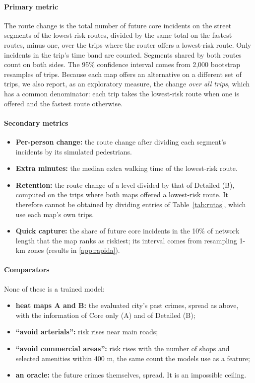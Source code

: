 \documentclass[preprint,12pt,authoryear]{elsarticle}
\begin{document}
\paragraph{Primary metric} The route change is the total number of future core incidents on the street segments of the lowest-risk routes, divided by the same total on the fastest routes, minus one, over the trips where the router offers a lowest-risk route. Only incidents in the trip's time band are counted. Segments shared by both routes count on both sides. The 95\% confidence interval comes from 2,000 bootstrap resamples of trips. Because each map offers an alternative on a different set of trips, we also report, as an exploratory measure, the change \emph{over all trips}, which has a common denominator: each trip takes the lowest-risk route when one is offered and the fastest route otherwise.

\paragraph{Secondary metrics}
\begin{itemize}
  \item \textbf{Per-person change:} the route change after dividing each segment's incidents by its simulated pedestrians.
  \item \textbf{Extra minutes:} the median extra walking time of the lowest-risk route.
  \item \textbf{Retention:} the route change of a level divided by that of Detailed (B), computed on the trips where both maps offered a lowest-risk route. It therefore cannot be obtained by dividing entries of Table~\ref{tab:rutas}, which use each map's own trips.
  \item \textbf{Quick capture:} the share of future core incidents in the 10\% of network length that the map ranks as riskiest; its interval comes from resampling 1-km zones (results in \ref{app:rapida}).
\end{itemize}

\paragraph{Comparators} None of these is a trained model:
\begin{itemize}
  \item \textbf{heat maps A and B:} the evaluated city's past crimes, spread as above, with the information of Core only (A) and of Detailed (B);
  \item \textbf{``avoid arterials'':} risk rises near main roads;
  \item \textbf{``avoid commercial areas'':} risk rises with the number of shops and selected amenities within 400 m, the same count the models use as a feature;
  \item \textbf{an oracle:} the future crimes themselves, spread. It is an impossible ceiling.
\end{itemize}
\end{document}
